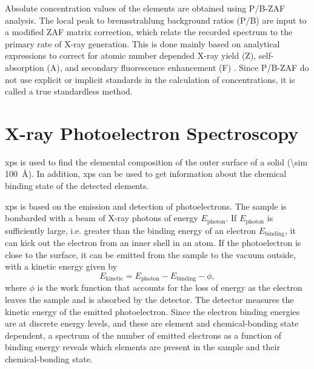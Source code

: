 Absolute concentration values of the elements are obtained using P/B-ZAF analysis. The local peak to bremsstrahlung background ratios (P/B) are input to a modified ZAF matrix correction, which relate the recorded spectrum to the primary rate of X-ray generation. This is done mainly based on analytical expressions to correct for atomic number depended X-ray yield (Z), self-absorption (A), and secondary fluorescence enhancement (F) \citep{quantax2008microanalysis}. Since P/B-ZAF do not use explicit or implicit standards in the calculation of concentrations, it is called a true standardless method.%


\section{X-ray Photoelectron Spectroscopy}\label{sec:xps}
\Acf{xps} is used to find the elemental composition of the outer surface of a solid (\SI{\sim 100}{\angstrom}). In addition, \ac{xps} can be used to get information about the chemical binding state of the detected elements.

\Ac{xps} is based on the emission and detection of photoelectrons. The sample is bombarded with a beam of X-ray photons of energy $E_\text{photon}$. If $E_\text{photon}$ is sufficiently large, i.e. greater than the binding energy of an electron $E_\text{binding}$, it can kick out the electron from an inner shell in an atom. If the photoelectron is close to the surface, it can be emitted from the sample to the vacuum outside, with a kinetic energy given by
\begin{equation}
    E_\text{kinetic} = E_\text{photon} - E_\text{binding} - \phi,
\end{equation}
where $\phi$ is the work function that accounts for the loss of energy as the electron leaves the sample and is absorbed by the detector. The detector measures the kinetic energy of the emitted photoelectron. Since the electron binding energies are at discrete energy levels, and these are element and chemical-bonding state dependent, a spectrum of the number of emitted electrons as a function of binding energy reveals which elements are present in the sample and their chemical-bonding state.

